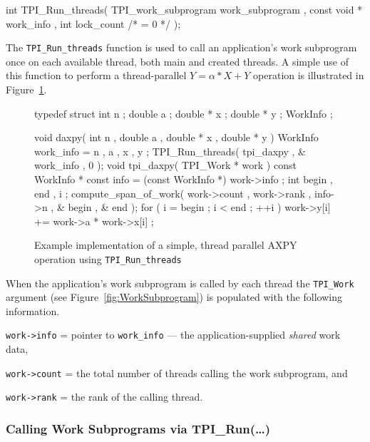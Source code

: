 \begin{center}
\small
\begin{boxedverbatim}
int TPI_Run_threads( TPI_work_subprogram work_subprogram  ,
                     const void *        work_info ,
                     int                 lock_count /* = 0 */ );
\end{boxedverbatim}
\end{center}

The \texttt{TPI\_Run\_threads} function is used to call an application's work subprogram
once on each available thread, both main and created threads.
%
A simple use of this function to perform a thread-parallel \mbox{$Y=\alpha*X+Y$} operation is illustrated in Figure~\ref{fig:WorkSubprogramAXPY}.

\begin{figure}[h]
\small
\center
\begin{boxedverbatim}
typedef struct {
  int n ;
  double a ;
  double * x ;
  double * y ;
} WorkInfo ;

void daxpy( int n , double a , double * x , double * y )
{
  WorkInfo work_info = { n , a , x , y };
  TPI_Run_threads( tpi_daxpy , & work_info , 0 );
}
void tpi_daxpy( TPI_Work * work )
{
  const WorkInfo * const info = (const WorkInfo *) work->info ;
  int begin , end , i ;
  compute_span_of_work( work->count , work->rank , info->n , & begin , & end );
  for ( i = begin ; i < end ; ++i ) {
    work->y[i] += work->a * work->x[i] ;
  }
}
\end{boxedverbatim}
\caption{Example implementation of a simple, thread parallel AXPY operation using \texttt{TPI\_Run\_threads}}
\label{fig:WorkSubprogramAXPY}
\end{figure}


When the application's work subprogram is called by each thread the \texttt{TPI\_Work} argument (see Figure~\ref{fig:WorkSubprogram}) is populated with the following information.
%
\begin{blist}
\item \texttt{work->info} = pointer to \texttt{work\_info} --- the application-supplied \emph{shared} work data,
\item \texttt{work->count} = the total number of threads calling the work subprogram, and
\item \texttt{work->rank} = the rank of the calling thread.
\end{blist}

\clearpage
\subsubsection{Calling Work Subprograms via TPI\_Run(\ldots)}

